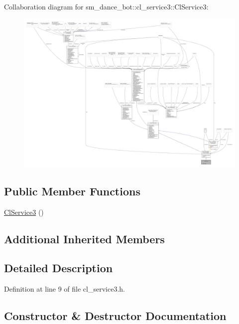 Collaboration diagram for sm\+\_\+dance\+\_\+bot\+:\+:cl\+\_\+service3\+:\+:Cl\+Service3\+:
\nopagebreak
\begin{figure}[H]
\begin{center}
\leavevmode
\includegraphics[width=350pt]{classsm__dance__bot_1_1cl__service3_1_1ClService3__coll__graph}
\end{center}
\end{figure}
\subsection*{Public Member Functions}
\begin{DoxyCompactItemize}
\item 
\hyperlink{classsm__dance__bot_1_1cl__service3_1_1ClService3_ab03b879865a37e88ceb753e20dd43311}{Cl\+Service3} ()
\end{DoxyCompactItemize}
\subsection*{Additional Inherited Members}


\subsection{Detailed Description}


Definition at line 9 of file cl\+\_\+service3.\+h.



\subsection{Constructor \& Destructor Documentation}
\mbox{\label{classsm__dance__bot_1_1cl__service3_1_1ClService3_ab03b879865a37e88ceb753e20dd43311}} 
